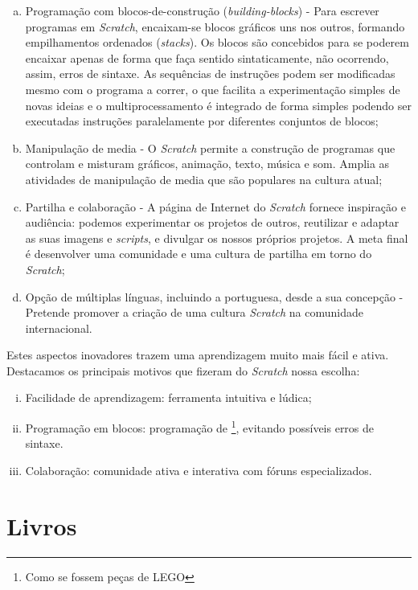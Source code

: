 \documentclass[12pt,fleqn]{book} %
\begin{document}
\begin{enumerate}[a)]
	\item Programação com blocos-de-construção (\textit{building-blocks}) - Para escrever programas em \textit{Scratch}, encaixam-se blocos gráficos uns nos outros, formando empilhamentos ordenados (\textit{stacks}). Os blocos são concebidos para se poderem encaixar apenas de forma que faça sentido sintaticamente, não ocorrendo, assim, erros de sintaxe. As sequências de instruções podem ser modificadas mesmo com o programa a correr, o que facilita a experimentação simples de novas ideias e o multiprocessamento é integrado de forma simples podendo ser executadas instruções paralelamente por diferentes conjuntos de blocos;
	\item Manipulação de media - O \textit{Scratch} permite a construção de programas que controlam e misturam gráficos, animação, texto, música e som. Amplia as atividades de manipulação de media que são populares na cultura atual;
	\item Partilha e colaboração - A página de Internet do \textit{Scratch} fornece inspiração e audiência: podemos experimentar os projetos de outros, reutilizar e adaptar as suas imagens e \textit{scripts}, e divulgar os nossos próprios projetos. A meta final é desenvolver uma comunidade e uma cultura de partilha em torno do \textit{Scratch};
	\item Opção de múltiplas línguas, incluindo a portuguesa, desde a sua concepção - Pretende promover a criação de uma cultura \textit{Scratch} na comunidade internacional.	
\end{enumerate}

Estes aspectos inovadores trazem uma aprendizagem muito mais fácil e ativa. Destacamos os principais motivos que fizeram do \textit{Scratch} nossa escolha:

\begin{enumerate}[i)]
	\item Facilidade de aprendizagem: ferramenta intuitiva e lúdica; 
	\item Programação em blocos: programação de \footnote{Como se fossem peças de LEGO}, evitando possíveis erros de sintaxe.
	\item Colaboração: comunidade ativa e interativa com fóruns especializados. 
\end{enumerate}

\section{Livros}
\end{document}
